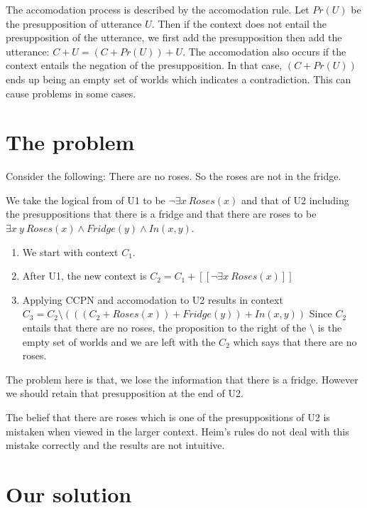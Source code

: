 \documentclass{article}
\begin{document}
The accomodation process is described by the accomodation rule. Let
$Pr(U)$ be the presupposition of utterance $U$. Then if the context
does not entail the presupposition of the utterance, we first add the
presupposition then add the utterance: $C + U = (C + Pr(U)) + U$. The
accomodation also occurs if the context entails the negation of the
presupposition. In that case, $(C + Pr(U))$ ends up being an empty set
of worlds which indicates a contradiction. This can cause problems in
some cases.


\section{The problem}


Consider the following:
\newline {} There are no roses.
\newline {} So the roses are not in the fridge.

We take the logical from of U1 to be $\neg \exists x~Roses(x)$ and
that of U2 including the presuppositions that there is a fridge and
that there are roses to be $\exists x~y~ Roses(x) \wedge Fridge(y)
\wedge In(x, y)$.

\begin{enumerate}
\item We start with context $C_1$.
\item After U1, the new context is $C_2 = C_1 + [[ \neg \exists x~Roses(x) ]]
$
\item Applying CCPN and accomodation to U2 results in context $C_3 =
C_2 \setminus (((C_2 + Roses(x)) + Fridge(y)) + In(x, y))$
Since $C_2$ entails that there are no roses, the proposition to the
right of the $\setminus$ is the empty set of worlds and we are left
with the $C_2$ which says that there are no roses.
\end{enumerate}

The problem here is that, we lose the information that there is a
fridge. However we should retain that presupposition at the end of U2.

The belief that there are roses which is one of the presuppositions of
U2 is mistaken when viewed in the larger context. Heim's rules do not
deal with this mistake correctly and the results are not intuitive.



\section{Our solution}
\end{document}
